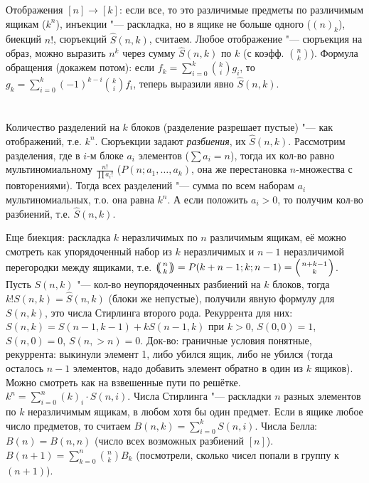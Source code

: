 Отображения $[n] \to [k]$: если все, то это различимые предметы по различимым ящикам ($k^n$),
инъекции "--- раскладка, но в ящике не больше одного ($(n)_k$), биекций $n!$, сюръекций $\hat S(n, k)$, считаем.
Любое отображение "--- сюръекция на образ, можно выразить $n^k$ через сумму $\hat S(n, k)$ по $k$
(с коэфф. $\binom{n}{k}$).
Формула обращения (докажем потом): если $f_k=\sum_{i=0}^k \binom{k}{i} g_i$, то $g_k=\sum_{i=0}^k (-1)^{k-i} \binom{k}{i} f_i$,
теперь выразили явно $\hat S(n, k)$.

\section{} %
Количество разделений на $k$ блоков (разделение разрешает пустые) "--- как отображений, т.е. $k^n$.
Сюръекции задают \textit{разбиения}, их $\hat S(n, k)$.
Рассмотрим разделения, где в $i$-м блоке $a_i$ элементов ($\sum a_i=n$),
тогда их кол-во равно мультиномиальному $\frac{n!}{\prod a_i!}$ ($P(n; a_1, \dots, a_k)$,
она же перестановка $n$-множества с повторениями).
Тогда всех разделений "--- сумма по всем наборам $a_i$ мультиномиальных, т.о. она равна $k^n$.
А если положить $a_i>0$, то получим кол-во разбиений, т.е. $\hat S(n, k)$.

Еще биекция: раскладка $k$ неразличимых по $n$ различимым ящикам, её можно смотреть
как упорядоченный набор из $k$ неразличимых и $n-1$ неразличимой перегородки между ящиками,
т.е. $\repbinom{n}{k}=P(k+n-1;k;n-1)=\binom{n+k-1}{k}$.
Пусть $S(n, k)$ "--- кол-во неупорядоченных разбиений на $k$ блоков, тогда $k!S(n, k)=\hat S(n, k)$
(блоки же непустые), получили явную формулу для $S(n, k)$, это числа Стирлинга второго рода.
Рекуррента для них: $S(n, k)=S(n-1, k-1)+kS(n-1, k)$ при $k>0$, $S(0,0)=1$, $S(n,0)=0$,
$S(n, >n)=0$.
Док-во: граничные условия понятные, рекуррента: выкинули элемент 1, либо убился ящик,
либо не убился (тогда осталось $n-1$ элементов, надо добавить элемент обратно в один из $k$ ящиков).
Можно смотреть как на взвешенные пути по решётке.
$k^n=\sum_{i=0}^n (k)_i \cdot S(n, i)$.
Числа Стирлинга "--- раскладки $n$ разных элементов по $k$ неразличимым ящикам, в любом хотя бы один предмет.
Если в ящике любое число предметов, то считаем $B(n, k)=\sum_{i=0}^k S(n, i)$.
Числа Белла: $B(n)=B(n, n)$ (число всех возможных разбиений $[n]$).
$B(n+1)=\sum_{k=0}^n \binom{n}{k} B_k$ (посмотрели, сколько чисел попали в группу к $(n+1)$).
